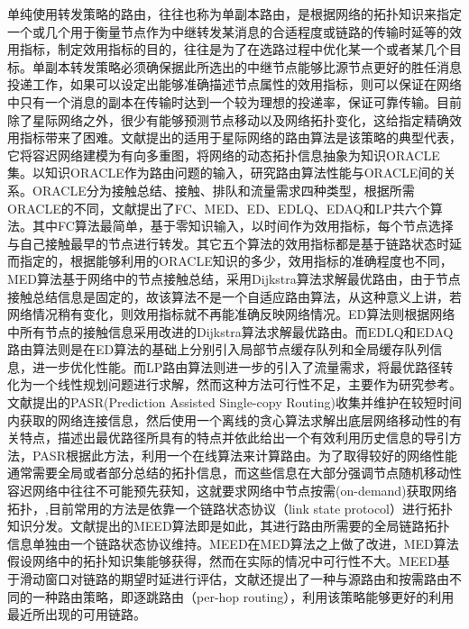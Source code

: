 单纯使用转发策略的路由，往往也称为单副本路由，是根据网络的拓扑知识来指定一个或几个用于衡量节点作为中继转发某消息的合适程度或链路的传输时延等的效用指标，制定效用指标的目的，往往是为了在选路过程中优化某一个或者某几个目标。单副本转发策略必须确保据此所选出的中继节点能够比源节点更好的胜任消息投递工作，如果可以设定出能够准确描述节点属性的效用指标，则可以保证在网络中只有一个消息的副本在传输时达到一个较为理想的投递率，保证可靠传输。目前除了星际网络之外，很少有能够预测节点移动以及网络拓扑变化，这给指定精确效用指标带来了困难。文献提出的适用于星际网络的路由算法是该策略的典型代表，它将容迟网络建模为有向多重图，将网络的动态拓扑信息抽象为知识ORACLE集。以知识ORACLE作为路由问题的输入，研究路由算法性能与ORACLE间的关系。ORACLE分为接触总结、接触、排队和流量需求四种类型，根据所需ORACLE的不同，文献提出了FC、MED、ED、EDLQ、EDAQ和LP共六个算法。其中FC算法最简单，基于零知识输入，以时间作为效用指标，每个节点选择与自己接触最早的节点进行转发。其它五个算法的效用指标都是基于链路状态时延而指定的，根据能够利用的ORACLE知识的多少，效用指标的准确程度也不同，MED算法基于网络中的节点接触总结，采用Dijkstra算法求解最优路由，由于节点接触总结信息是固定的，故该算法不是一个自适应路由算法，从这种意义上讲，若网络情况稍有变化，则效用指标就不再能准确反映网络情况。ED算法则根据网络中所有节点的接触信息采用改进的Dijkstra算法求解最优路由。而EDLQ和EDAQ路由算法则是在ED算法的基础上分别引入局部节点缓存队列和全局缓存队列信息，进一步优化性能。而LP路由算法则进一步的引入了流量需求，将最优路径转化为一个线性规划问题进行求解，然而这种方法可行性不足，主要作为研究参考。文献提出的PASR(Prediction Assisted Single-copy Routing)收集并维护在较短时间内获取的网络连接信息，然后使用一个离线的贪心算法求解出底层网络移动性的有关特点，描述出最优路径所具有的特点并依此给出一个有效利用历史信息的导引方法，PASR根据此方法，利用一个在线算法来计算路由。为了取得较好的网络性能通常需要全局或者部分总结的拓扑信息，而这些信息在大部分强调节点随机移动性容迟网络中往往不可能预先获知，这就要求网络中节点按需(on-demand)获取网络拓扑，,目前常用的方法是依靠一个链路状态协议（link state protocol）进行拓扑知识分发。文献提出的MEED算法即是如此，其进行路由所需要的全局链路拓扑信息单独由一个链路状态协议维持。MEED在MED算法之上做了改进，MED算法假设网络中的拓扑知识集能够获得，然而在实际的情况中可行性不大。MEED基于滑动窗口对链路的期望时延进行评估，文献还提出了一种与源路由和按需路由不同的一种路由策略，即逐跳路由（per-hop routing），利用该策略能够更好的利用最近所出现的可用链路。


